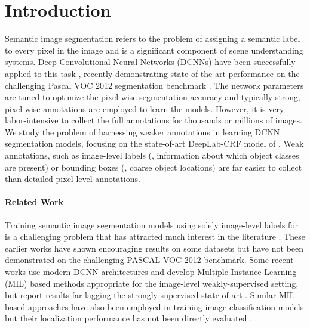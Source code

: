 \section{Introduction}
\label{sec:intro}

Semantic image segmentation refers to the problem of assigning a
semantic label to every pixel in the image and is a significant
component of scene understanding systems. Deep Convolutional Neural
Networks (DCNNs) have been successfully applied to this task
\citep{farabet2013learning, pinheiro2014recurrent,
  eigen2014predicting}, recently demonstrating state-of-the-art
performance on the challenging Pascal VOC 2012 segmentation benchmark
\citep{chen2014semantic, mostajabi2014feedforward,
  long2014fully}. The network parameters are tuned to
optimize the pixel-wise segmentation accuracy and typically strong,
pixel-wise annotations are employed to learn the models. However, it
is very labor-intensive to collect the full annotations for thousands
or millions of images. We study the problem of harnessing weaker
annotations in learning DCNN segmentation models, focusing on the
state-of-art DeepLab-CRF model of \citet{chen2014semantic}. Weak
annotations, such as image-level labels (\ie, information about which
object classes are present) or bounding boxes (\ie, coarse object
locations) are far easier to collect than detailed pixel-level
annotations.

\paragraph{Related Work}

Training semantic image segmentation models using solely image-level
labels for  is a challenging problem that has attracted much interest 
in the literature \citep{duygulu2002object, verbeek2007region,
  vezhnevets2010towards, vezhnevets2011weakly, vezhnevets2012weakly,
  xu2014tell}. These earlier works have shown encouraging results
on some datasets but have not been demonstrated on the challenging
PASCAL VOC 2012 benchmark. Some recent works use modern DCNN
architectures and develop Multiple Instance Learning (MIL) based
methods appropriate for the image-level weakly-supervised setting, but
report results far lagging the strongly-supervised state-of-art
\citep{pathak2014fully, pinheiro2014weakly}. Similar MIL-based
approaches have also been employed in training image classification
models but their localization performance has not been directly
evaluated \citep{oquab2014weakly, papandreou2014untangling}. 

